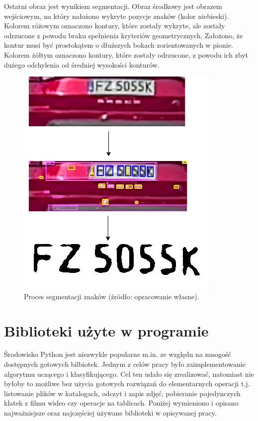 Ostatni obraz jest wynikiem segmentacji.
Obraz środkowy jest obrazem wejściowym, na który nałożono wykryte pozycje znaków (kolor niebieski).
Kolorem różowym oznaczono kontury, które zostały wykryte, ale zostały odrzucone z powodu braku spełnienia kryteriów geometrycznych.
Założono, że kontur musi być prostokątem o dłuższych bokach zorientowanych w pionie.
Kolorem żółtym oznaczono kontury, które zostały odrzucone, z powodu ich zbyt dużego odchylenia od średniej wysokości konturów.
\begin{figure}[!ht]
    \centering
    \includegraphics[scale=0.4]{Pictures/segmentation}
    \caption{Proces segmentacji znaków (źródło: opracowanie własne).}
    \label{fig:segmentation}
\end{figure}
\FloatBarrier


\section{Biblioteki użyte w programie}
Środowisko Python jest niezwykle popularne m.in. ze względu na mnogość dostępnych gotowych bilbiotek.
Jednym z celów pracy było zaimplementowanie algorytmu uczącego i klasyfikującego.
Cel ten udało się zrealizować, natomiast nie byłoby to możliwe bez użycia gotowych rozwiązań do elementarnych operacji t.j. listowanie plików w katalogach, odczyt i zapis zdjęć, pobieranie pojedynczych klatek z filmu wideo czy operacje na tablicach.
Poniżej wymieniono i opisano najważniejsze oraz najczęściej używane biblioteki w opisywanej pracy.

